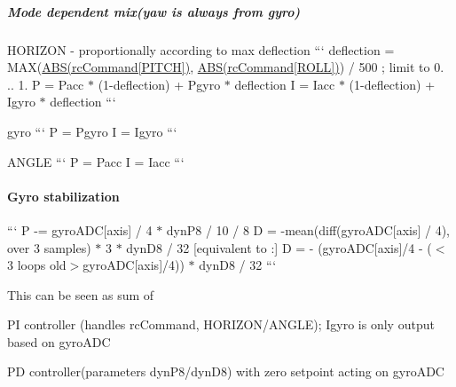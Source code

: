 \subparagraph*{Mode dependent mix(yaw is always from gyro)}


\begin{DoxyItemize}
\item H\+O\+R\+I\+Z\+O\+N -\/ proportionally according to max deflection ``` deflection = M\+A\+X(\hyperlink{maths_8h_a996f7be338ccb40d1a2a5abc1ad61759}{A\+B\+S(rc\+Command\mbox{[}\+P\+I\+T\+C\+H\mbox{]})}, \hyperlink{maths_8h_a996f7be338ccb40d1a2a5abc1ad61759}{A\+B\+S(rc\+Command\mbox{[}\+R\+O\+L\+L\mbox{]})}) / 500 ; limit to 0. .. 1. P = Pacc $\ast$ (1-\/deflection) + Pgyro $\ast$ deflection I = Iacc $\ast$ (1-\/deflection) + Igyro $\ast$ deflection ```
\item gyro ``` P = Pgyro I = Igyro ```
\item A\+N\+G\+L\+E ``` P = Pacc I = Iacc ``` \paragraph*{Gyro stabilization}
\end{DoxyItemize}

``` P -\/= gyro\+A\+D\+C\mbox{[}axis\mbox{]} / 4 $\ast$ dyn\+P8 / 10 / 8 D = -\/mean(diff(gyro\+A\+D\+C\mbox{[}axis\mbox{]} / 4), over 3 samples) $\ast$ 3 $\ast$ dyn\+D8 / 32 \mbox{[}equivalent to \+:\mbox{]} D = -\/ (gyro\+A\+D\+C\mbox{[}axis\mbox{]}/4 -\/ ($<$3 loops old$>$gyro\+A\+D\+C\mbox{[}axis\mbox{]}/4)) $\ast$ dyn\+D8 / 32 ```

This can be seen as sum of
\begin{DoxyItemize}
\item P\+I controller (handles rc\+Command, H\+O\+R\+I\+Z\+O\+N/\+A\+N\+G\+L\+E); {\ttfamily Igyro} is only output based on gyro\+A\+D\+C
\item P\+D controller(parameters dyn\+P8/dyn\+D8) with zero setpoint acting on gyro\+A\+D\+C 
\end{DoxyItemize}